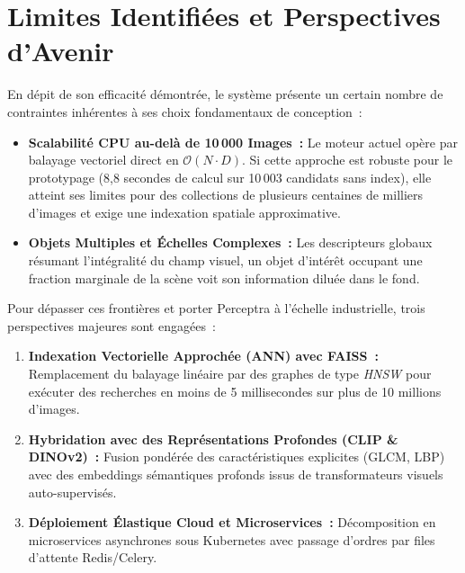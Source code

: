 \section{Limites Identifiées et Perspectives d'Avenir}

En dépit de son efficacité démontrée, le système présente un certain nombre de contraintes inhérentes à ses choix fondamentaux de conception~:
\begin{itemize}
    \item \textbf{Scalabilité CPU au-delà de 10\,000 Images~:} Le moteur actuel opère par balayage vectoriel direct en $\mathcal{O}(N \cdot D)$. Si cette approche est robuste pour le prototypage (8,8 secondes de calcul sur 10\,003 candidats sans index), elle atteint ses limites pour des collections de plusieurs centaines de milliers d'images et exige une indexation spatiale approximative.
    \item \textbf{Objets Multiples et Échelles Complexes~:} Les descripteurs globaux résumant l'intégralité du champ visuel, un objet d'intérêt occupant une fraction marginale de la scène voit son information diluée dans le fond.
\end{itemize}

Pour dépasser ces frontières et porter Perceptra à l'échelle industrielle, trois perspectives majeures sont engagées~:
\begin{enumerate}
    \item \textbf{Indexation Vectorielle Approchée (ANN) avec FAISS~:} Remplacement du balayage linéaire par des graphes de type \textit{HNSW} pour exécuter des recherches en moins de 5 millisecondes sur plus de 10 millions d'images.
    \item \textbf{Hybridation avec des Représentations Profondes (CLIP \& DINOv2)~:} Fusion pondérée des caractéristiques explicites (GLCM, LBP) avec des embeddings sémantiques profonds issus de transformateurs visuels auto-supervisés.
    \item \textbf{Déploiement Élastique Cloud et Microservices~:} Décomposition en microservices asynchrones sous Kubernetes avec passage d'ordres par files d'attente Redis/Celery.
\end{enumerate}
